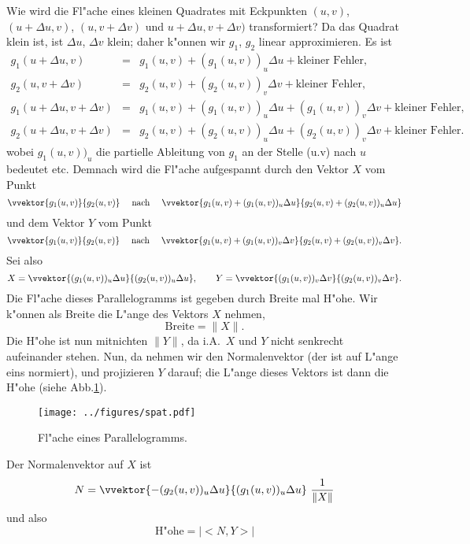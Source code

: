 Wie wird die Fl"ache eines kleinen Quadrates mit Eckpunkten $(u,v)$, 
$(u+\Delta u,v)$, $(u,v+\Delta v)$ und $u+\Delta u, v+\Delta v)$ transformiert? 
Da das Quadrat klein ist, ist $\Delta u$, $\Delta v$ klein; daher k"onnen wir 
$g_1$, $g_2$ linear approximieren. Es ist
 \begin{eqnarray*}
 g_1(u+\Delta u,v)                   & = & g_1(u,v)+(g_1(u,v))_u\Delta u + \mbox{kleiner Fehler},\\
 g_2(u,v+\Delta v)                  & = &  g_2(u,v)   +(g_2(u,v))_v\Delta v + \mbox{kleiner Fehler},\\
 g_1(u+\Delta u,v+\Delta v) & = &  g_1(u,v)+(g_1(u,v))_u\Delta u+ (g_1(u,v) )_v\Delta v + \mbox{kleiner Fehler},\\
 g_2(u+\Delta u,v+\Delta v) &=&  g_2(u,v)  +(g_2(u,v))_u\Delta u+ (g_2(u,v))_v\Delta v + \mbox{kleiner Fehler}.
  \end{eqnarray*}
wobei $g_1(u,v))_u$ die partielle Ableitung von $g_1$ an der Stelle (u.v) nach 
$u$ bedeutet etc. Demnach wird die Fl"ache aufgespannt durch den Vektor $X$ vom 
Punkt
$$  \vvektor{g_1(u,v)}{ g_2(u,v)} \quad \mbox{ nach } \quad \vvektor{g_1(u,v)+(g_1(u,v))_u\Delta u }{ g_2(u,v)+(g_2(u,v))_u\Delta u}$$
und dem Vektor $Y$ vom Punkt 
  $$  \vvektor{g_1(u,v)}{ g_2(u,v)} \quad \mbox{ nach } \quad \vvektor{ g_1(u,v)+(g_1(u,v))_v\Delta v}{ g_2(u,v)+(g_2(u,v))_v\Delta v}.$$
  Sei also
  $$ X = \vvektor{(g_1(u,v))_u\Delta u}{(g_2(u,v))_u\Delta u}, \qquad Y = \vvektor{(g_1(u,v))_v\Delta v}{(g_2(u,v))_v\Delta v}.$$
Die Fl"ache dieses Parallelogramms ist gegeben durch Breite mal H"ohe. 
Wir k"onnen 
als Breite die L"ange des Vektors $X$ nehmen, 
$$\mbox{Breite} = \|X\|.$$
Die H"ohe ist nun mitnichten $ \|Y\|$, da i.A.\ $X$ und $Y$ nicht senkrecht 
aufeinander stehen. Nun, da nehmen wir den Normalenvektor (der ist auf L"ange 
eins normiert), und projizieren $Y$ darauf; die L"ange dieses Vektors
ist dann die H"ohe (siehe Abb.\ref{para}).\par
\begin{figure}[htbp] %
   \centering
   \texttt{[image: ../figures/spat.pdf]} 
   \caption{Fl"ache eines Parallelogramms.   }
   \label{para}
\end{figure}
Der Normalenvektor auf $X$ ist
$$ N =  \vvektor{-(g_2(u,v))_u\Delta u}{(g_1(u,v))_u\Delta u}\,\,\frac  1{\|X\|}$$
und also
$$ \mbox{H"ohe} = |<N, Y>|$$

